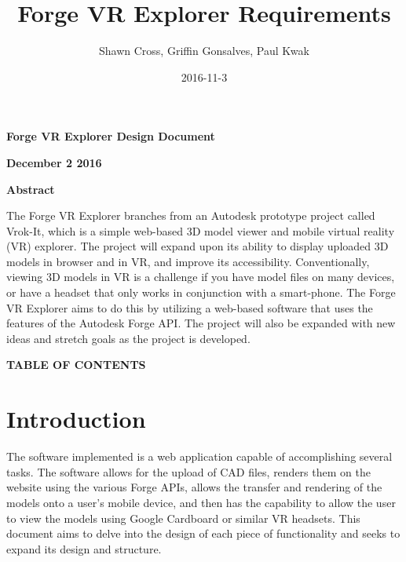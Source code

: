 \documentclass[letterpaper, 10pt, draftclsnofoot, compsoc, onecolumn]{IEEEtran}
\title{Forge VR Explorer Requirements}
\author{Shawn Cross, Griffin Gonsalves, Paul Kwak}
\date{2016-11-3}
\begin{document}
\clearpage\setcounter{page}{1}\pagestyle{Standard}
\thispagestyle{FirstPage}

\bigskip

{\centering{}\bfseries\color{black}
Forge VR Explorer Design Document
\par}

\bigskip

{\centering{}\bfseries\color{black}
December 2 2016
\par}
\bigskip
\bigskip
\bigskip
\bigskip
\bigskip
\bigskip
\bigskip
\bigskip
\bigskip
\bigskip
\bigskip
\bigskip

\vfill
{\centering{}\bfseries\color{black}
Abstract
\par}

{\centering{}\mdseries\color{black}
	The Forge VR Explorer branches from an Autodesk prototype project called Vrok-It, which is a simple web-based 3D 
	model viewer and mobile virtual reality (VR) explorer. The project will expand upon its ability to display uploaded 3D 
	models in browser and in VR, and improve its accessibility. Conventionally, viewing 3D models in VR is a challenge if 
	you have model files on many devices, or have a headset that only works in conjunction with a smart-phone. The 
	Forge VR Explorer aims to do this by utilizing a web-based software that uses the features of the Autodesk Forge API. 
	The project will also be expanded with new ideas and stretch goals as the project is developed.
\par}
\clearpage
{\centering{}\bfseries\color{black}
TABLE OF CONTENTS
\par}

\bigskip

\setcounter{tocdepth}{2}
\renewcommand\contentsname{}
\tableofcontents

\bigskip
\clearpage

\section{Introduction}
The software implemented is a web application capable of accomplishing several tasks. The software allows for the upload of CAD files, renders them on the website using the various Forge APIs, allows the transfer and rendering of the models onto a user's mobile device, and then has the capability to allow the user to view the models using Google Cardboard or similar VR headsets. This document aims to delve into the design of each piece of functionality and seeks to expand its design and structure.
\end{document}
